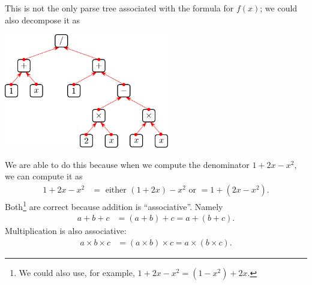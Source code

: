 This is not the only parse tree associated with the formula for $f(x)$; we
could also decompose it as
\begin{fig}
\begin{center}
\includegraphics[height=5cm]{tree1a}
\end{center}
\end{fig}
We are able to do this because when we compute the denominator $1+2x-x^2$, we
can compute it as
\begin{align*}
  1+2x-x^2 &= \text{ either } (1+2x)-x^2 \text{ or } = 1 + (2x-x^2).
\end{align*}
Both\footnote{We could also use, for example, $1+2x-x^2 = (1-x^2)+2x$.} are
correct because addition is ``associative''. Namely
\begin{align*}
  a+b+c &= (a+b)+c = a+(b+c).
\end{align*}
Multiplication is also associative:
\begin{align*}
  a \times b \times c &= (a \times b) \times c = a \times (b \times c).
\end{align*}

